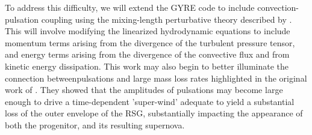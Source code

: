  To address this difficulty, we will extend the GYRE code to include convection-pulsation coupling using the mixing-length perturbative theory described by \citet{Grigahcene:2005}. This will involve modifying the linearized hydrodynamic equations to include momentum terms arising from the divergence of the turbulent pressure tensor, and energy terms arising from the divergence of the convective flux and from kinetic energy dissipation. This work may also begin to better illuminate the connection betweenpulsations and large mass loss rates highlighted in the original work of \citet{Yoon_2010}. 
They showed that the amplitudes of pulsations may become large enough to drive a time-dependent
'super-wind' adequate to yield a substantial loss of the outer envelope of the RSG, substantially impacting the appearance of both the progenitor, and its resulting supernova.